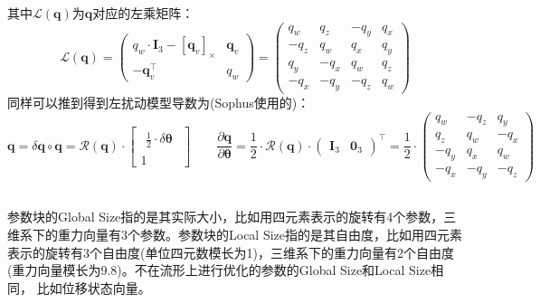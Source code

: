 \documentclass[12pt, onecolumn]{article}
\newcommand\normf{\fangsong}
\newcommand\liehat[1]{\left[ #1 \right]_\times}
\begin{document}
	其中$\mathcal{L}\left(\boldsymbol{q} \right)$为$\boldsymbol{q}$对应的左乘矩阵：
	\begin{equation}
	\mathcal{L}\left(\boldsymbol{q} \right)=\begin{pmatrix}
	q_w\cdot\boldsymbol{I}_3-\liehat{\boldsymbol{q}_v}&\boldsymbol{q}_v\\
	-\boldsymbol{q}_v^\top&q_w
	\end{pmatrix}=\left( \begin{array}{ccc|c}
	q_w&q_z&-q_y&q_x\\
	-q_z&q_w&q_x&q_y\\
	q_y&-q_x&q_w&q_z\\
	\hline
	-q_x&-q_y&-q_z&q_w
	\end{array}\right) 
	\end{equation}
	同样可以推到得到左扰动模型导数为(Sophus使用的)：
	\begin{equation}
	\boldsymbol{q}=\delta\boldsymbol{q}\circ\boldsymbol{q}=\mathcal{R}(\boldsymbol{q})\cdot\begin{bmatrix}
	\begin{aligned}
	\frac{1}{2}\cdot\delta\boldsymbol{\theta}
	\end{aligned}\\1
	\end{bmatrix}
	\qquad
		\frac{\partial \boldsymbol{q}}{\partial \boldsymbol{\theta}}
		=\frac{1}{2}\cdot\mathcal{R}\left(\boldsymbol{q} \right) \cdot\begin{pmatrix}
		\boldsymbol{I}_3&\boldsymbol{0}_3
		\end{pmatrix}^\top=
		\frac{1}{2}\cdot\left( \begin{array}{ccc}
		q_w&-q_z&q_y\\
		q_z&q_w&-q_x\\
		-q_y&q_x&q_w\\
		\hline
		-q_x&-q_y&-q_z
		\end{array}\right)
	\end{equation}


	\subsection{\normf{ceres评估函数}}
	参数块的Global Size指的是其实际大小，比如用四元素表示的旋转有4个参数，三维系下的重力向量有3个参数。参数块的Local Size指的是其自由度，比如用四元素表示的旋转有3个自由度(单位四元数模长为1)，三维系下的重力向量有2个自由度(重力向量模长为9.8)。不在流形上进行优化的参数的Global Size和Local Size相同， 比如位移状态向量。
	
\end{document}
